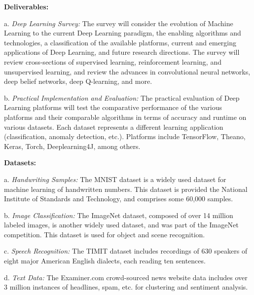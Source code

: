 \documentclass[12pt]{article}
\begin{document}
	\begin{flushleft}
		\item{\textbf{Deliverables:}}
		
		\hspace{4ex} a. \textit{Deep Learning Survey:} The survey will consider the evolution of Machine Learning to the current Deep Learning paradigm, the enabling algorithms and technologies, a classification of the available platforms,  current and emerging applications of Deep Learning, and future research directions. The survey will review cross-sections of supervised learning, reinforcement learning, and unsupervised learning, and review the advances in convolutional neural networks, deep belief networks, deep Q-learning, and more.
		
		\hspace{4ex} b. \textit{Practical Implementation and Evaluation:} The practical evaluation of Deep Learning platforms will test the comparative performance of the various platforms and their comparable algorithms in terms of accuracy and runtime on various datasets. Each dataset represents a different learning application (classification, anomaly detection, etc.). Platforms include TensorFlow, Theano, Keras, Torch, Deeplearning4J, among others. \\[11pt]
		
		\item{\textbf{Datasets:}}
		
		\hspace{4ex} a. \textit{Handwriting Samples:} The MNIST dataset is a widely used dataset for machine learning of handwritten numbers. This dataset is provided the National Institute of Standards and Technology, and comprises some 60,000 samples. 
		
		\hspace{4ex} b. \textit{Image Classification:} The ImageNet dataset, composed of over 14 million labeled images, is another widely used dataset, and was part of the ImageNet competition. This dataset is used for object and scene recognition.
		
		\hspace{4ex} c. \textit{Speech Recognition:} The TIMIT dataset includes recordings of 630 speakers of eight major American English dialects, each reading ten sentences.  
		
		\hspace{4ex} d. \textit{Text Data:} The Examiner.com crowd-sourced news website data includes over 3 million instances of headlines, spam, etc. for clustering and sentiment analysis.
		

\end{flushleft}
\end{document}
